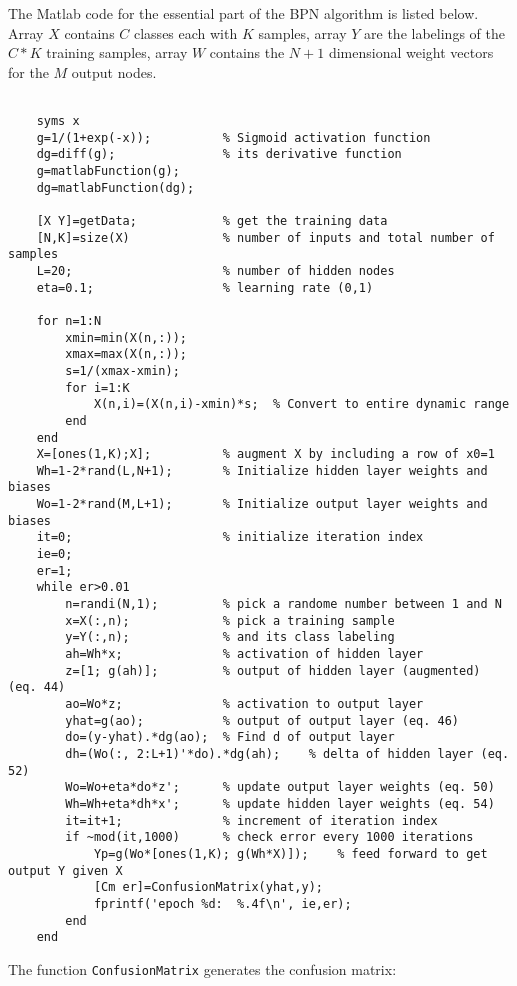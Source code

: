 \documentclass{article}
\begin{document}
The Matlab code for the essential part of the BPN algorithm is listed 
below. Array $X$ contains $C$ classes each with $K$ samples, array $Y$
are the labelings of the $C*K$ training samples, array $W$ contains the
$N+1$ dimensional weight vectors for the $M$ output nodes.

\begin{verbatim}

    syms x 
    g=1/(1+exp(-x));          % Sigmoid activation function
    dg=diff(g);               % its derivative function
    g=matlabFunction(g);
    dg=matlabFunction(dg);
    
    [X Y]=getData;            % get the training data
    [N,K]=size(X)             % number of inputs and total number of samples
    L=20;                     % number of hidden nodes
    eta=0.1;                  % learning rate (0,1)
     
    for n=1:N
        xmin=min(X(n,:));
        xmax=max(X(n,:));
        s=1/(xmax-xmin);
        for i=1:K
            X(n,i)=(X(n,i)-xmin)*s;  % Convert to entire dynamic range  
        end
    end
    X=[ones(1,K);X];          % augment X by including a row of x0=1  
    Wh=1-2*rand(L,N+1);       % Initialize hidden layer weights and biases
    Wo=1-2*rand(M,L+1);       % Initialize output layer weights and biases
    it=0;                     % initialize iteration index
    ie=0;
    er=1;
    while er>0.01
        n=randi(N,1);         % pick a randome number between 1 and N
        x=X(:,n);             % pick a training sample      
        y=Y(:,n);             % and its class labeling
        ah=Wh*x;              % activation of hidden layer  
        z=[1; g(ah)];         % output of hidden layer (augmented) (eq. 44)
        ao=Wo*z;              % activation to output layer
        yhat=g(ao);           % output of output layer (eq. 46)
        do=(y-yhat).*dg(ao);  % Find d of output layer 
        dh=(Wo(:, 2:L+1)'*do).*dg(ah);    % delta of hidden layer (eq. 52)
        Wo=Wo+eta*do*z';      % update output layer weights (eq. 50)
        Wh=Wh+eta*dh*x';      % update hidden layer weights (eq. 54)
        it=it+1;              % increment of iteration index
        if ~mod(it,1000)      % check error every 1000 iterations
            Yp=g(Wo*[ones(1,K); g(Wh*X)]);    % feed forward to get output Y given X
            [Cm er]=ConfusionMatrix(yhat,y);
            fprintf('epoch %d:  %.4f\n', ie,er);
        end
    end
\end{verbatim}

The function \verb|ConfusionMatrix| generates the confusion matrix:
\end{document}
